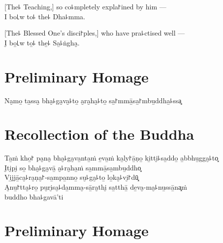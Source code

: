 [The꜕ Teaching,] so co꜕mpletely expla꜓ined by him ---\\
I bo꜖w to꜕ the꜕ Dha꜕mma. 

[The꜕ Blessed One's disci꜓ples,] who have pra꜕ctised well ---\\
I̮ bo̱꜖w to̱꜕ the̱꜕ Sa̱꜕ṅgha̮. 

\clearpage

\chapter*{Preliminary Homage}

\begin{leader}
\end{leader}

Na̮mo̱ ta̱ssa̮ bha̮꜕ga̮va̮꜕to̱ a̮ra̮ha̮꜕to̱ sa̱꜓mmā̱sa̱꜓mbu̱ddha̱꜕ssa͓


\chapter*{Recollection of the Buddha}

\delegateSetUseNext

\begin{leader}
\end{leader}

Ta̱ṁ kho̱꜓ pa̮na̮ bha̮꜕ga̮va̱nta̱ṁ e̱va̱ṁ ka̱ly꜓ā̱ṇo̱ ki̱tti̮꜕sa̱ddo̱ a̱bbhu̱gga̮꜕to͓\\
I̮ti̮pi̮ so̱ bha̮꜕ga̮vā̱ a̮꜕ra̮ha̱ṁ sa̱mmā̱sa̱mbu̱ddho͓\\
Vi̱jjā̱ca̮꜕ra̮ṇa̮꜓-sa̱mpa̱nno̱ su̮꜕ga̮꜕to̱ lo̱ka̮꜕vi̮꜓dū͓\\
A̮nu̱꜓tta̮꜕ro̱ pu̮ri̮sa̮꜕da̱mma̮-sā̱ra̮thi̮ sa̱tthā̱ de̱va̮-ma̮꜕nu̱ssā̱na͓ṁ\\
\vin buddho bha꜕gavā'ti

\clearpage

\chapter{Preliminary Homage}

\begin{leader}
\end{leader}

